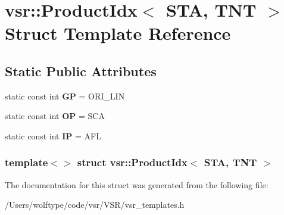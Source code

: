 \hypertarget{structvsr_1_1_product_idx_3_01_s_t_a_00_01_t_n_t_01_4}{\section{vsr\-:\-:Product\-Idx$<$ S\-T\-A, T\-N\-T $>$ Struct Template Reference}
\label{structvsr_1_1_product_idx_3_01_s_t_a_00_01_t_n_t_01_4}
}
\subsection*{Static Public Attributes}
\begin{DoxyCompactItemize}
\item 
\hypertarget{structvsr_1_1_product_idx_3_01_s_t_a_00_01_t_n_t_01_4_a78d96bc6910c2b3306c8716c6071265b}{static const int {\bfseries G\-P} = O\-R\-I\-\_\-\-L\-I\-N}\label{structvsr_1_1_product_idx_3_01_s_t_a_00_01_t_n_t_01_4_a78d96bc6910c2b3306c8716c6071265b}

\item 
\hypertarget{structvsr_1_1_product_idx_3_01_s_t_a_00_01_t_n_t_01_4_a43e81c2a17966863e0296c2f21963f41}{static const int {\bfseries O\-P} = S\-C\-A}\label{structvsr_1_1_product_idx_3_01_s_t_a_00_01_t_n_t_01_4_a43e81c2a17966863e0296c2f21963f41}

\item 
\hypertarget{structvsr_1_1_product_idx_3_01_s_t_a_00_01_t_n_t_01_4_a86f7359679b27a36de54472cf70f10af}{static const int {\bfseries I\-P} = A\-F\-L}\label{structvsr_1_1_product_idx_3_01_s_t_a_00_01_t_n_t_01_4_a86f7359679b27a36de54472cf70f10af}

\end{DoxyCompactItemize}
\subsubsection*{template$<$$>$ struct vsr\-::\-Product\-Idx$<$ S\-T\-A, T\-N\-T $>$}



The documentation for this struct was generated from the following file\-:\begin{DoxyCompactItemize}
\item 
/\-Users/wolftype/code/vsr/\-V\-S\-R/vsr\-\_\-templates.\-h\end{DoxyCompactItemize}
